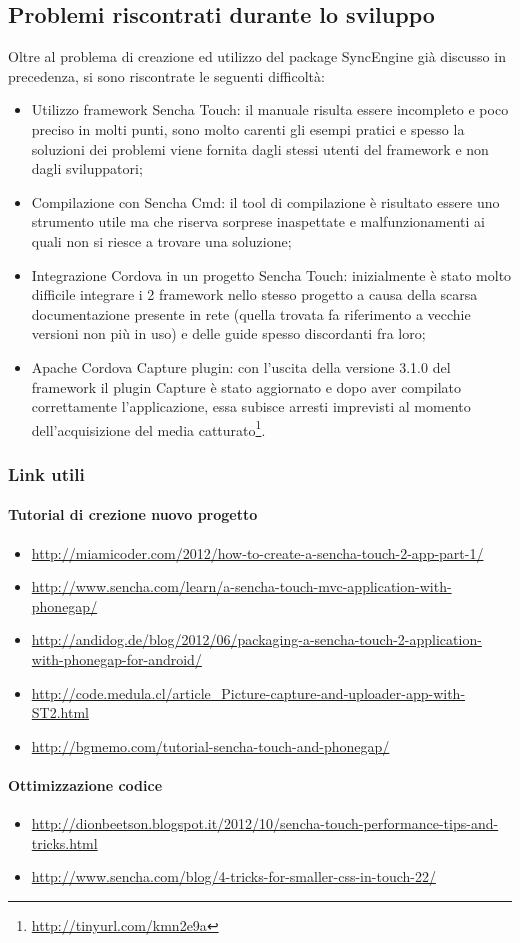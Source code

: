 \subsection{Problemi riscontrati durante lo sviluppo}
Oltre al problema di creazione ed utilizzo del package SyncEngine già discusso in precedenza, si sono riscontrate le seguenti difficoltà:
\begin{itemize}
\item Utilizzo framework Sencha Touch: il manuale risulta essere incompleto e poco preciso in molti punti, sono molto carenti gli esempi pratici e spesso la soluzioni dei problemi viene fornita dagli stessi utenti del framework e non dagli sviluppatori;
\item Compilazione con Sencha Cmd: il tool di compilazione è risultato essere uno strumento utile ma che riserva sorprese inaspettate e malfunzionamenti ai quali non si riesce a trovare una soluzione;
\item Integrazione Cordova in un progetto Sencha Touch: inizialmente è stato molto difficile integrare i 2 framework nello stesso progetto a causa della scarsa documentazione presente in rete (quella trovata fa riferimento a vecchie versioni non più in uso) e delle guide spesso discordanti fra loro;
\item Apache Cordova Capture plugin: con l'uscita della versione 3.1.0 del framework il plugin Capture è stato aggiornato e dopo aver compilato correttamente l'applicazione, essa subisce arresti imprevisti al momento dell'acquisizione del media catturato\footnote{\url{http://tinyurl.com/kmn2e9a}}.
\end{itemize}

\subsubsection{Link utili}
\paragraph*{Tutorial di crezione nuovo progetto}
\begin{itemize}
\item \url{http://miamicoder.com/2012/how-to-create-a-sencha-touch-2-app-part-1/}
\item \url{http://www.sencha.com/learn/a-sencha-touch-mvc-application-with-phonegap/}
\item \url{http://andidog.de/blog/2012/06/packaging-a-sencha-touch-2-application-with-phonegap-for-android/}
\item \url{http://code.medula.cl/article_Picture-capture-and-uploader-app-with-ST2.html}
\item \url{http://bgmemo.com/tutorial-sencha-touch-and-phonegap/}
\end{itemize}

\paragraph*{Ottimizzazione codice}
\begin{itemize}
\item \url{http://dionbeetson.blogspot.it/2012/10/sencha-touch-performance-tips-and-tricks.html}
\item \url{http://www.sencha.com/blog/4-tricks-for-smaller-css-in-touch-22/}
\end{itemize}